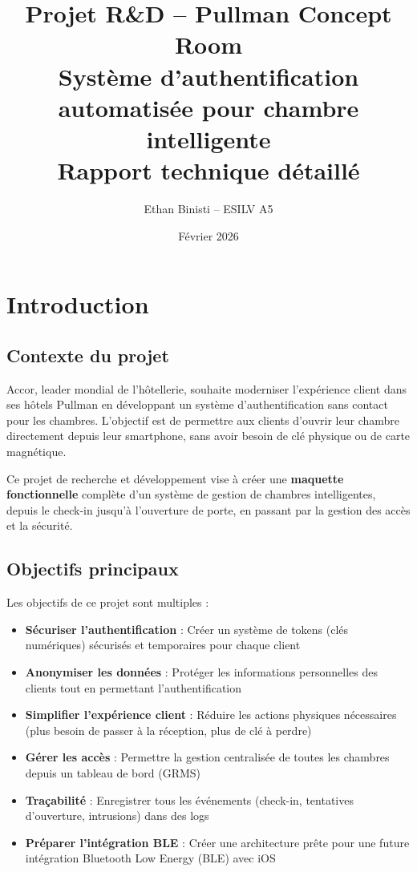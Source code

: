 \documentclass[11pt,a4paper]{article}
\title{Projet R\&D -- Pullman Concept Room\\\large Système d'authentification automatisée pour chambre intelligente\\\normalsize Rapport technique détaillé}
\author{Ethan Binisti -- ESILV A5}
\date{Février 2026}
\begin{document}
\maketitle

\tableofcontents
\newpage

\section{Introduction}

\subsection{Contexte du projet}

Accor, leader mondial de l'hôtellerie, souhaite moderniser l'expérience client dans ses hôtels Pullman en développant un système d'authentification sans contact pour les chambres. L'objectif est de permettre aux clients d'ouvrir leur chambre directement depuis leur smartphone, sans avoir besoin de clé physique ou de carte magnétique.

Ce projet de recherche et développement vise à créer une \textbf{maquette fonctionnelle} complète d'un système de gestion de chambres intelligentes, depuis le check-in jusqu'à l'ouverture de porte, en passant par la gestion des accès et la sécurité.

\subsection{Objectifs principaux}

Les objectifs de ce projet sont multiples :

\begin{itemize}
    \item \textbf{Sécuriser l'authentification} : Créer un système de tokens (clés numériques) sécurisés et temporaires pour chaque client
    \item \textbf{Anonymiser les données} : Protéger les informations personnelles des clients tout en permettant l'authentification
    \item \textbf{Simplifier l'expérience client} : Réduire les actions physiques nécessaires (plus besoin de passer à la réception, plus de clé à perdre)
    \item \textbf{Gérer les accès} : Permettre la gestion centralisée de toutes les chambres depuis un tableau de bord (GRMS)
    \item \textbf{Traçabilité} : Enregistrer tous les événements (check-in, tentatives d'ouverture, intrusions) dans des logs
    \item \textbf{Préparer l'intégration BLE} : Créer une architecture prête pour une future intégration Bluetooth Low Energy (BLE) avec iOS
\end{itemize}
\end{document}
